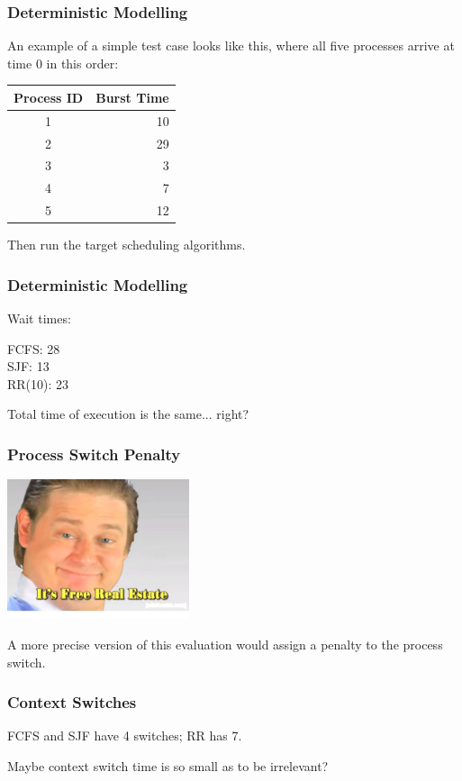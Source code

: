 \begin{frame}
\frametitle{Deterministic Modelling}

An example of a simple test case looks like this, where all five processes arrive at time 0 in this order:

\begin{center}
\begin{tabular}{c|r}
	\textbf{Process ID} & \textbf{Burst Time}\\ \hline
	1 & 10 \\
	2 & 29 \\
	3 & 3 \\
	4 & 7 \\
	5 & 12 \\
\end{tabular}
\end{center}

Then run the target scheduling algorithms.

\end{frame}

\begin{frame}
\frametitle{Deterministic Modelling}

Wait times:

FCFS: 28\\
SJF: 13\\
RR(10): 23

Total time of execution is the same... right?

\end{frame}

\begin{frame}
\frametitle{Process Switch Penalty}

\begin{center}
	\includegraphics[width=0.4\textwidth]{images/free-realestate.jpg}
\end{center}

A more precise version of this evaluation would assign a penalty to the process switch.

\end{frame}


\begin{frame}
\frametitle{Context Switches}

FCFS and SJF have 4 switches; RR has 7.

Maybe context switch time is so small as to be irrelevant?

\end{frame}

